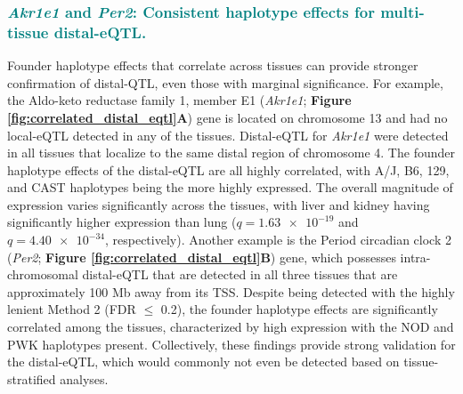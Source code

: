 \documentclass[9pt,twocolumn,twoside]{gsajnl}
\newcommand{\GKinline}[1]{\textcolor{teal}{#1}}
\begin{document}
\subsubsection{\GKinline{\textit{Akr1e1} and \textit{Per2}: Consistent haplotype effects for multi-tissue distal-eQTL.}}
Founder haplotype effects that correlate across tissues can provide stronger confirmation of distal-QTL, even those with marginal significance. 
For example, the Aldo-keto reductase family 1, member E1 (\textit{Akr1e1}; \textbf{Figure \ref{fig:correlated_distal_eqtl}A}) gene is located on chromosome 13 and had no local-eQTL detected in any of the tissues. Distal-eQTL for \textit{Akr1e1} were detected in all tissues that localize to the same distal region of chromosome 4. The founder haplotype effects of the distal-eQTL are all highly correlated, with A/J, B6, 129, and CAST haplotypes being the more highly expressed. The overall magnitude of expression varies significantly across the tissues, with liver and kidney having significantly higher expression than lung ($q = \num{1.63e-19}$ and $q = \num{4.40e-34}$, respectively).
Another example is the Period circadian clock 2 (\textit{Per2}; \textbf{Figure \ref{fig:correlated_distal_eqtl}B}) gene, which possesses intra-chromosomal distal-eQTL that are detected in all three tissues that are approximately 100 Mb away from its TSS. Despite being detected with the highly lenient Method 2 (FDR $\leq$ 0.2), the founder haplotype effects are significantly correlated among the tissues, characterized by high expression with the NOD and PWK haplotypes present. Collectively, these findings provide strong validation for the distal-eQTL, which would commonly not even be detected based on tissue-stratified analyses.
\end{document}
